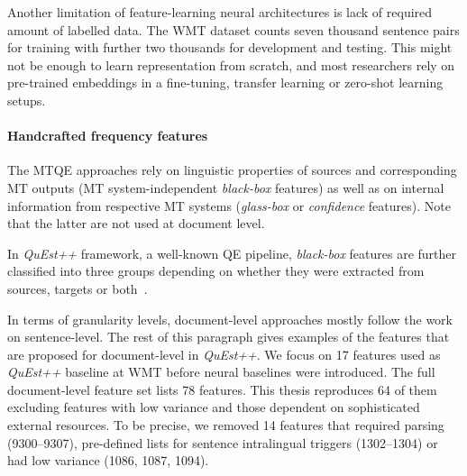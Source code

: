 Another limitation of feature-learning neural architectures is lack of required amount of labelled data. The WMT dataset counts seven thousand sentence pairs for training with further two thousands for development and testing. This might not be enough to learn representation from scratch,
and most researchers rely on pre-trained embeddings in a fine-tuning, transfer learning or zero-shot learning setups.
 
\paragraph{\label{par:mt_handcrafted}Handcrafted frequency features} 
The \gls*{MTQE} approaches rely on linguistic properties of sources and corresponding MT outputs (MT system-independent \textit{black-box} features) as well as on internal information from respective MT systems (\textit{glass-box} or \textit{confidence} features). Note that the latter are not used at document level. 

In \textit{QuEst++} framework, a well-known QE pipeline, \textit{black-box} features are further classified into three groups depending on whether they were extracted from sources, targets or both~\cite{Specia2018a}. 

In terms of granularity levels, document-level approaches mostly follow the work on sentence-level. 
The rest of this paragraph gives examples of the features that are proposed for document-level in \textit{QuEst++}.
We focus on 17 features used as \textit{QuEst++} baseline at WMT before neural baselines were introduced. The full document-level feature set lists 78 features. This thesis reproduces 64 of them excluding features with low variance and those dependent on sophisticated external resources. To be precise, we removed 14 features that required parsing (9300--9307), pre-defined lists for sentence intralingual triggers (1302--1304) or had low variance (1086, 1087, 1094).

